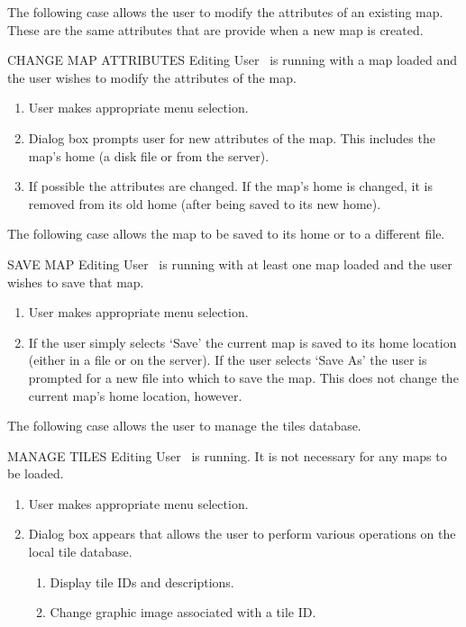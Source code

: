 The following case allows the user to modify the attributes of an existing map. These are the same attributes that are provide when a new map is created.

\begin{usecase}
  {CHANGE MAP ATTRIBUTES}
  {Editing User}
  {\MapEditor\ is running with a map loaded and the user wishes to modify the attributes of the map.}
\begin{enumerate}
\item User makes appropriate menu selection.
\item Dialog box prompts user for new attributes of the map. This includes the map's home (a disk file or from the server).
\item If possible the attributes are changed. If the map's home is changed, it is removed from its old home (after being saved to its new home).
\end{enumerate}
\end{usecase}

The following case allows the map to be saved to its home or to a different file.

\begin{usecase}
  {SAVE MAP}
  {Editing User}
  {\MapEditor\ is running with at least one map loaded and the user wishes to save that map.}
\begin{enumerate}
\item User makes appropriate menu selection.
\item If the user simply selects `Save' the current map is saved to its home location (either in a file or on the server). If the user selects `Save As' the user is prompted for a new file into which to save the map. This does not change the current map's home location, however.
\end{enumerate}
\end{usecase}

The following case allows the user to manage the tiles database.

\begin{usecase}
  {MANAGE TILES}
  {Editing User}
  {\MapEditor\ is running. It is not necessary for any maps to be loaded.}
\begin{enumerate}
\item User makes appropriate menu selection.
\item Dialog box appears that allows the user to perform various operations on the local tile database.
  \begin{enumerate}
    \item Display tile IDs and descriptions.
    \item Change graphic image associated with a tile ID.
  \end{enumerate}
\end{enumerate}
\end{usecase}

